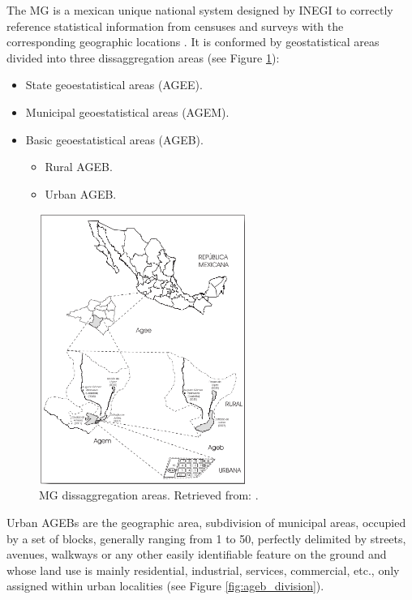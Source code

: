 The MG is a mexican unique national system designed by INEGI to correctly reference statistical information from censuses and surveys with the corresponding geographic locations \cite{manualMGN}. It is conformed by geostatistical areas divided into three dissaggregation areas (see Figure \ref{fig:MGN_divisions}):

\begin{itemize}
 \item State geoestatistical areas (AGEE).
 \item Municipal geoestatistical areas (AGEM).
 \item Basic geoestatistical areas (AGEB).
  \begin{itemize}
   \item Rural AGEB.
   \item Urban AGEB.
  \end{itemize}
\end{itemize}

\begin{figure}[htpb]
  \centering
  \includegraphics[width=0.6\textwidth]{Figures/MGN_divisions.png}
  \caption{MG dissaggregation areas. Retrieved from: \cite{manualMGN}.
    \label{fig:MGN_divisions}}
\end{figure}

Urban AGEBs are the geographic area, subdivision of municipal areas, occupied by a set of blocks, generally ranging from 1 to 50, perfectly delimited by streets, avenues, walkways or any other easily identifiable feature on the ground and whose land use is mainly residential, industrial, services, commercial, etc., only assigned within urban localities (see Figure \ref{fig:ageb_division}).

